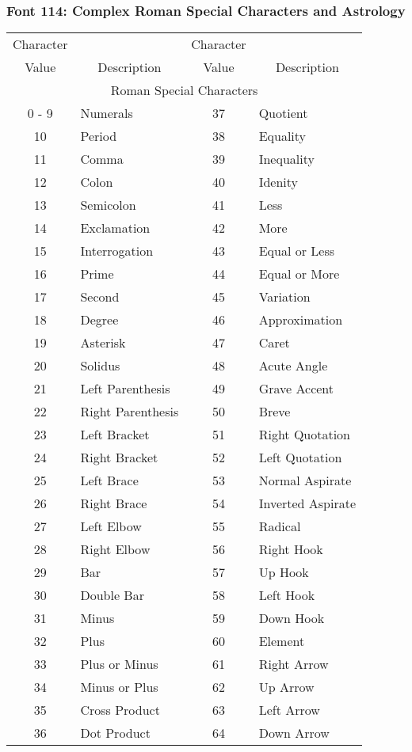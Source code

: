 \subsubsection{Font 114: Complex Roman Special Characters and Astrology}
\begin{tabular}{|c|l|c|l|}
\hline
\multicolumn{1}{|c|}{Character}
& & \multicolumn{1}{|c|}{Character}&\\
\multicolumn{1}{|c|}{Value}
&\multicolumn{1}{|c|}{Description}
&\multicolumn{1}{|c|}{Value}
&\multicolumn{1}{|c|}{Description}\\
\hline
\multicolumn{4}{|c|}{Roman Special Characters}\\
\hline
0 - 9 & Numerals & 37 & Quotient\\
10 & Period & 38 & Equality\\
11 & Comma & 39 & Inequality\\
12 & Colon & 40 & Idenity\\
13 & Semicolon & 41 & Less\\
14 & Exclamation & 42 & More\\
15 & Interrogation & 43 & Equal or Less\\
16 & Prime & 44 & Equal or More\\
17 & Second & 45 & Variation\\
18 & Degree & 46 & Approximation\\
19 & Asterisk & 47 & Caret\\
20 & Solidus & 48 & Acute Angle \\
21 & Left Parenthesis & 49 & Grave Accent\\
22 & Right Parenthesis & 50 & Breve\\
23 & Left Bracket & 51 & Right Quotation\\
24 & Right Bracket & 52 & Left Quotation\\
25 & Left Brace & 53 & Normal Aspirate\\
26 & Right Brace & 54 & Inverted Aspirate\\
27 & Left Elbow & 55 & Radical\\
28 & Right Elbow & 56 & Right Hook\\
29 & Bar & 57 & Up Hook\\
30 & Double Bar & 58 & Left Hook\\
31 & Minus & 59 & Down Hook\\
32 & Plus & 60 & Element\\
33 & Plus or Minus & 61 & Right Arrow\\
34 & Minus or Plus & 62 & Up Arrow\\
35 & Cross Product & 63 & Left Arrow\\
36 & Dot Product & 64 & Down Arrow\\ \hline
\end{tabular}
